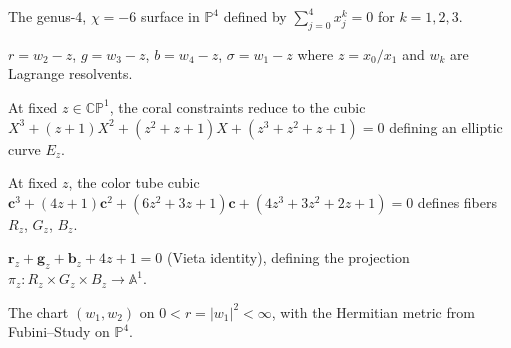 \begin{definition}
  \label{def:brings-surface-ch5}
  The genus-4, $\chi=-6$ surface in $\mathbb{P}^4$ defined by
  $\sum_{j=0}^4 x_j^k = 0$ for $k=1,2,3$.
\end{definition}

\begin{definition}
  \label{def:color-tube-coordinates}
  $r = w_2 - z$, $g = w_3 - z$, $b = w_4 - z$, $\sigma = w_1 - z$
  where $z = x_0/x_1$ and $w_k$ are Lagrange resolvents.
\end{definition}

\begin{proposition}
  \label{prop:coral-elliptic}
  At fixed $z \in \mathbb{CP}^1$, the coral constraints reduce
  to the cubic $X^3 + (z+1)X^2 + (z^2+z+1)X + (z^3+z^2+z+1) = 0$
  defining an elliptic curve $E_z$.
\end{proposition}

\begin{definition}
  \label{def:color-tube-fibers}
  At fixed $z$, the color tube cubic
  $\mathbf{c}^3 + (4z+1)\mathbf{c}^2 + (6z^2+3z+1)\mathbf{c}
  + (4z^3+3z^2+2z+1) = 0$ defines fibers $R_z$, $G_z$, $B_z$.
\end{definition}

\begin{definition}
  \label{def:observed-value}
  $\mathbf{r}_z + \mathbf{g}_z + \mathbf{b}_z + 4z + 1 = 0$
  (Vieta identity), defining the projection
  $\pi_z : R_z \times G_z \times B_z \to \mathbb{A}^1$.
\end{definition}

\begin{definition}
  \label{def:briggs-klein-chart}
  The chart $(w_1, w_2)$ on $0 < r = |w_1|^2 < \infty$, with
  the Hermitian metric from Fubini--Study on $\mathbb{P}^4$.
\end{definition}

